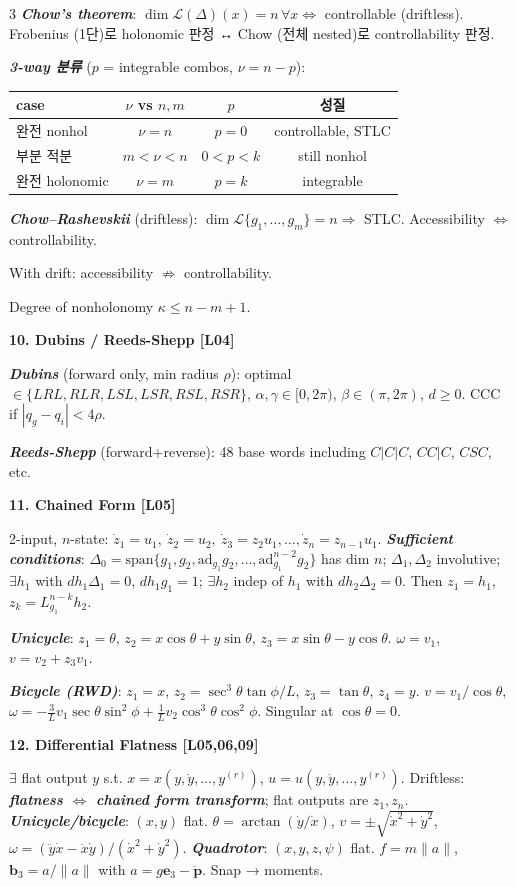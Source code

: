 \documentclass[8pt,a4paper,landscape]{extarticle}
\newcommand{\sect}[1]{\vspace{1pt}\colorbox{black!10}{\parbox{\linewidth}{\textbf{\footnotesize #1}}}\vspace{1pt}}
\newcommand{\sub}[1]{\textbf{\textit{#1}}}
\begin{document}
\begin{multicols*}{3}
\sub{Chow's theorem}: $\dim\mathcal L(\Delta)(x)=n\,\forall x \iff$ controllable (driftless).
Frobenius (1단)로 holonomic 판정 ↔ Chow (전체 nested)로 controllability 판정.

\sub{3-way 분류} ($p$ = integrable combos, $\nu=n-p$):
\begin{tabular}{@{}lccc@{}}
\toprule
case & $\nu$ vs $n,m$ & $p$ & 성질 \\
\midrule
완전 nonhol & $\nu=n$ & $p=0$ & controllable, STLC \\
부분 적분 & $m<\nu<n$ & $0<p<k$ & still nonhol \\
완전 holonomic & $\nu=m$ & $p=k$ & integrable \\
\bottomrule
\end{tabular}

\sub{Chow–Rashevskii} (driftless): $\dim\mathcal{L}\{g_1,\dots,g_m\}=n \Rightarrow$ STLC. Accessibility $\iff$ controllability.

With drift: accessibility $\not\Rightarrow$ controllability.

Degree of nonholonomy $\kappa\le n-m+1$.

\sect{10. Dubins / Reeds-Shepp \hfill {\scriptsize[L04]}}
\sub{Dubins} (forward only, min radius $\rho$): optimal $\in\{LRL, RLR, LSL, LSR, RSL, RSR\}$, $\alpha,\gamma\in[0,2\pi)$, $\beta\in(\pi,2\pi)$, $d\ge 0$. CCC if $|q_g-q_i|<4\rho$.

\sub{Reeds-Shepp} (forward+reverse): 48 base words including $C|C|C$, $CC|C$, $CSC$, etc.

\sect{11. Chained Form \hfill {\scriptsize[L05]}}
2-input, $n$-state:
$\dot z_1=u_1,\ \dot z_2=u_2,\ \dot z_3=z_2 u_1,\dots,\dot z_n=z_{n-1}u_1$.
\sub{Sufficient conditions}: $\Delta_0=\text{span}\{g_1,g_2,\text{ad}_{g_1}g_2,\dots,\text{ad}_{g_1}^{n-2}g_2\}$ has dim $n$; $\Delta_1, \Delta_2$ involutive; $\exists h_1$ with $dh_1\Delta_1=0$, $dh_1 g_1=1$; $\exists h_2$ indep of $h_1$ with $dh_2 \Delta_2=0$. Then $z_1=h_1$, $z_k=L_{g_1}^{n-k}h_2$.

\sub{Unicycle}: $z_1=\theta$, $z_2=x\cos\theta+y\sin\theta$, $z_3=x\sin\theta-y\cos\theta$. $\omega=v_1$, $v=v_2+z_3 v_1$.

\sub{Bicycle (RWD)}: $z_1=x$, $z_2=\sec^3\theta\tan\phi/L$, $z_3=\tan\theta$, $z_4=y$. $v=v_1/\cos\theta$, $\omega=-\tfrac{3}{L}v_1\sec\theta\sin^2\phi+\tfrac{1}{L}v_2\cos^3\theta\cos^2\phi$. Singular at $\cos\theta=0$.

\sect{12. Differential Flatness \hfill {\scriptsize[L05,06,09]}}
$\exists$ flat output $y$ s.t. $x=x(y,\dot y,\dots,y^{(r)})$, $u=u(y,\dot y,\dots,y^{(r)})$.
Driftless: \sub{flatness $\iff$ chained form transform}; flat outputs are $z_1, z_n$.
\sub{Unicycle/bicycle}: $(x,y)$ flat.
$\theta=\arctan(\dot y/\dot x)$, $v=\pm\sqrt{\dot x^2+\dot y^2}$, $\omega=(\ddot y\dot x-\ddot x\dot y)/(\dot x^2+\dot y^2)$.
\sub{Quadrotor}: $(x,y,z,\psi)$ flat. $f=m\|a\|$, $\mathbf b_3=a/\|a\|$ with $a=g\mathbf e_3-\ddot{\mathbf p}$. Snap → moments.


\end{multicols*}
\end{document}
